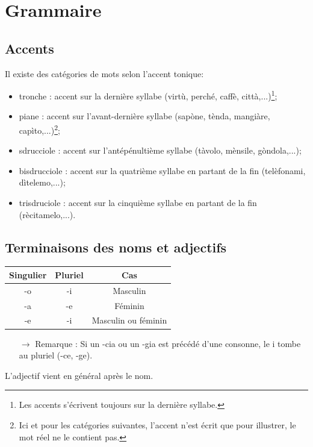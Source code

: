 \documentclass[12pt, openany]{report}
\begin{document}
\chapter{Grammaire}
\section{Accents}
Il existe des catégories de mots selon l'accent tonique:
\begin{itemize}
    \item tronche : accent sur la dernière syllabe (virtù, perché, caffè, città,...)\footnote{Les accents s'écrivent toujours sur la dernière syllabe.};
    \item piane : accent sur l'avant-dernière syllabe (sapòne, tènda, mangiàre, capìto,...)\footnote{Ici et pour les catégories suivantes, l'accent n'est écrit que pour illustrer, le mot réel ne le contient pas.};
    \item sdrucciole : accent sur l'antépénultième syllabe (tàvolo, mènsile, gòndola,...);
    \item bisdrucciole : accent sur la quatrième syllabe en partant de la fin (telèfonami, dìtelemo,...);
    \item trisdruciole : accent sur la cinquième syllabe en partant de la fin (rècitamelo,...).
\end{itemize}
\section{Terminaisons des noms et adjectifs}
\begin{center}
    \begin{tabular}{c|c|c}
        Singulier & Pluriel & Cas\\
        \hline
        -o & -i & Masculin \\
        -a & -e & Féminin \\
        -e & -i & Masculin ou féminin\\
    \end{tabular}
\end{center}
\begin{itemize}
    \item [$\rightarrow$] Remarque : Si un -cia ou un -gia est précédé d'une consonne, le i tombe au pluriel (-ce, -ge).
\end{itemize}
L'adjectif vient en général après le nom.
\end{document}
